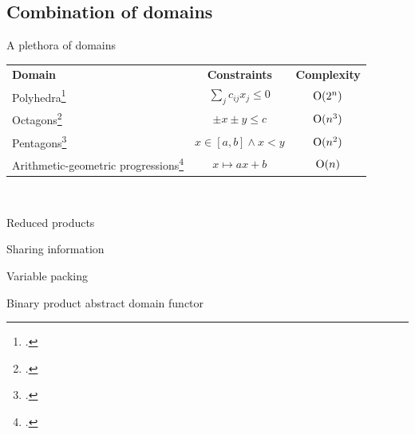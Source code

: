 \documentclass[aspectratio=169,14pt]{beamer}
\begin{document}
\subsection{Combination of domains}
\begin{frame}{A plethora of domains}
  \footnotesize
  \begin{tabular*}{1.0\linewidth}{lcc}
    \textbf{Domain} & \textbf{Constraints} & \textbf{Complexity} \\
    Polyhedra\footcite{cousot1978automatic} & \( \sum_{j} c_{ij}x_j \leq 0 \) & $ \operatorname{O}(2^n) $ \\
    Octagons\footcite{mine2004weakly} & \( \pm x \pm y \leq c \) & $ \operatorname{O}(n^3) $ \\
    Pentagons\footcite{logozzo2010pentagons} & \( x \in [a,b] \wedge x < y \) & $ \operatorname{O}(n^2) $ \\
    Arithmetic-geometric progressions\footcite{feret2005arithmetic} & \( x \mapsto ax + b \) & $ \operatorname{O}(n) $
  \end{tabular*}

   \\

  \vspace*{1em}

\end{frame}

\begin{frame}{Reduced products}
\end{frame}

\begin{frame}{Sharing information}
\end{frame}

\begin{frame}{Variable packing}
\end{frame}

\begin{frame}{Binary product abstract domain functor}

\end{frame}
\end{document}
